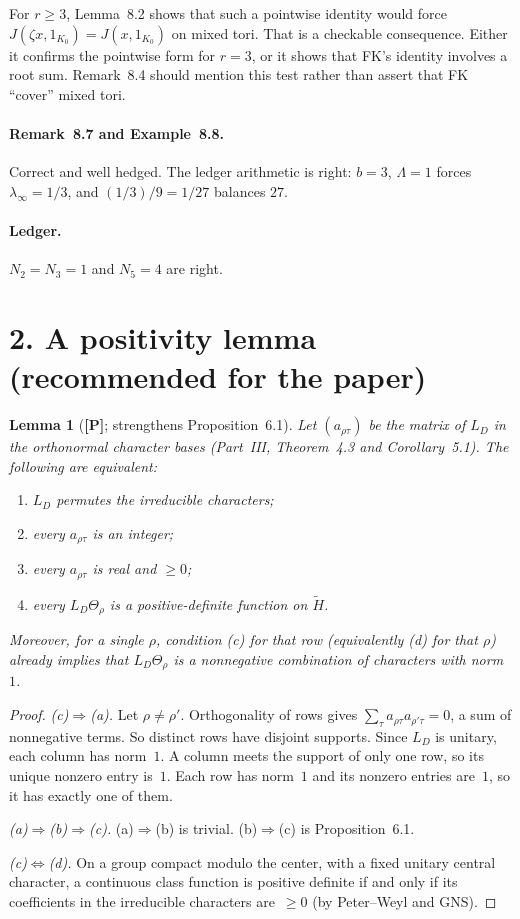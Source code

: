 \documentclass[11pt]{article}
\newcommand{\tH}{\widetilde H}
\theoremstyle{plain}
\newtheorem*{lem*}{Lemma}
\begin{document}
For $r\ge3$, Lemma~8.2 shows that such a pointwise identity would force
$J(\zeta x,1_{K_0})=J(x,1_{K_0})$ on mixed tori. That is a checkable
consequence. Either it confirms the pointwise form for $r=3$, or it
shows that FK's identity involves a root sum. Remark~8.4 should mention
this test rather than assert that FK ``cover'' mixed tori.

\paragraph{Remark~8.7 and Example~8.8.} Correct and well hedged. The
ledger arithmetic is right: $b=3$, $\Lambda=1$ forces
$\lambda_\infty=1/3$, and $(1/3)/9=1/27$ balances $27$.

\paragraph{Ledger.} $N_2=N_3=1$ and $N_5=4$ are right.

\section*{2. A positivity lemma (recommended for the paper)}
\begin{lem*}[\textbf{[P]}; strengthens Proposition~6.1]
Let $(a_{\rho\tau})$ be the matrix of $L_D$ in the orthonormal character
bases (Part~III, Theorem~4.3 and Corollary~5.1). The following are
equivalent:
\begin{enumerate}[label=(\alph*)]
\item $L_D$ permutes the irreducible characters;
\item every $a_{\rho\tau}$ is an integer;
\item every $a_{\rho\tau}$ is real and $\ge0$;
\item every $L_D\Theta_\rho$ is a positive-definite function on $\tH$.
\end{enumerate}
Moreover, for a single $\rho$, condition (c) for that row (equivalently
(d) for that $\rho$) already implies that $L_D\Theta_\rho$ is a
nonnegative combination of characters with norm~$1$.
\end{lem*}

\begin{proof}
\emph{(c)$\Rightarrow$(a).} Let $\rho\ne\rho'$. Orthogonality of rows
gives $\sum_\tau a_{\rho\tau}a_{\rho'\tau}=0$, a sum of nonnegative
terms. So distinct rows have disjoint supports. Since $L_D$ is unitary,
each column has norm~$1$. A column meets the support of only one row,
so its unique nonzero entry is~$1$. Each row has norm~$1$ and its
nonzero entries are~$1$, so it has exactly one of them.

\emph{(a)$\Rightarrow$(b)$\Rightarrow$(c).} (a)$\Rightarrow$(b) is
trivial. (b)$\Rightarrow$(c) is Proposition~6.1.

\emph{(c)$\Leftrightarrow$(d).} On a group compact modulo the center,
with a fixed unitary central character, a continuous class function is
positive definite if and only if its coefficients in the irreducible
characters are~$\ge0$ (by Peter--Weyl and GNS).
\end{proof}
\end{document}

